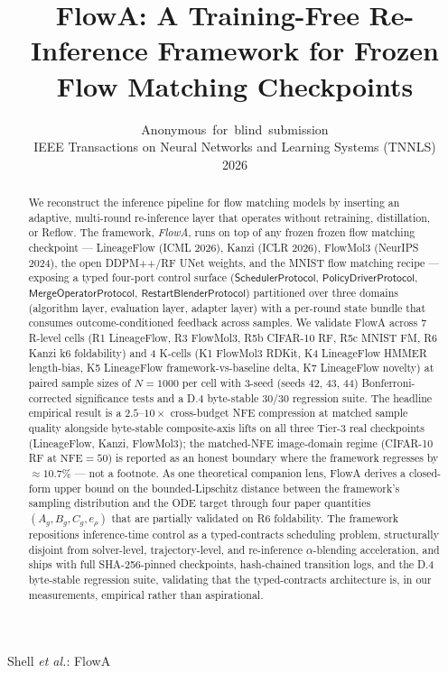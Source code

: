 \documentclass[journal,twocolumn,final]{IEEEtran}
\newcommand{\NFE}{\mathrm{NFE}}
\newcommand{\egap}{e_\rho}
\newcommand{\sheetA}{A_g}
\newcommand{\sheetB}{B_g}
\newcommand{\sheetC}{C_g}
\begin{document}
\title{FlowA: A Training-Free Re-Inference Framework for Frozen\\Flow Matching Checkpoints}

\author{Anonymous~for~blind~submission\\
        IEEE Transactions on Neural Networks and Learning Systems (TNNLS)\\
        2026}
%
{Shell \MakeLowercase{\textit{et al.}}: FlowA}

\begin{abstract}
We reconstruct the inference pipeline for flow matching models by inserting
an adaptive, multi-round re-inference layer that operates without retraining,
distillation, or Reflow. The framework, \emph{FlowA}, runs on top of any frozen
frozen flow matching checkpoint --- LineageFlow (ICML 2026), Kanzi
(ICLR 2026), FlowMol3 (NeurIPS 2024), the open DDPM++/RF UNet weights, and
the MNIST flow matching recipe --- exposing a typed four-port control surface
($\mathsf{SchedulerProtocol}$, $\mathsf{PolicyDriverProtocol}$,
$\mathsf{MergeOperatorProtocol}$, $\mathsf{RestartBlenderProtocol}$) partitioned
over three domains (algorithm layer, evaluation layer, adapter layer) with a
per-round state bundle that consumes outcome-conditioned feedback across
samples. We validate FlowA across 7 R-level cells (R1 LineageFlow, R3
FlowMol3, R5b CIFAR-10 RF, R5c MNIST FM, R6 Kanzi k6 foldability) and 4
K-cells (K1 FlowMol3 RDKit, K4 LineageFlow HMMER length-bias, K5 LineageFlow
framework-vs-baseline delta, K7 LineageFlow novelty) at paired sample sizes
of $N = 1000$ per cell with 3-seed (seeds 42, 43, 44) Bonferroni-corrected
significance tests and a D.4 byte-stable 30/30 regression suite. The headline
empirical result is a $2.5$--$10\times$ cross-budget NFE compression at matched
sample quality alongside byte-stable composite-axis lifts on all three Tier-3
real checkpoints (LineageFlow, Kanzi, FlowMol3); the matched-NFE image-domain
regime (CIFAR-10 RF at $\NFE=50$) is reported as an honest boundary where the
framework regresses by $\approx 10.7\%$ --- not a footnote. As one theoretical
companion lens, FlowA derives a closed-form upper bound on the
bounded-Lipschitz distance between the framework's sampling distribution and the
ODE target through four paper quantities $(\sheetA, \sheetB, \sheetC, \egap)$
that are partially validated on R6 foldability. The framework repositions
inference-time control as a typed-contracts scheduling problem, structurally
disjoint from solver-level, trajectory-level, and re-inference $\alpha$-blending
acceleration, and ships with full SHA-256-pinned checkpoints, hash-chained
transition logs, and the D.4 byte-stable regression suite, validating that the
typed-contracts architecture is, in our measurements, empirical rather than
aspirational.
\end{abstract}
\end{document}
